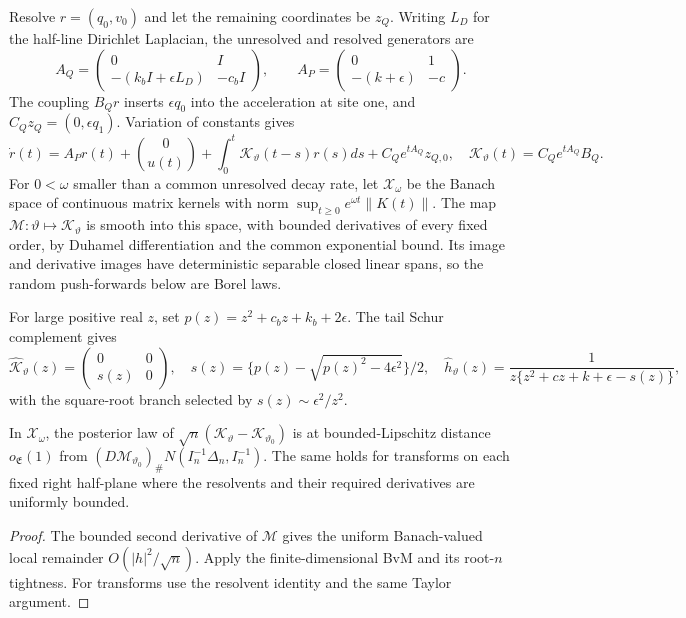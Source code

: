 Resolve \(r=(q_0,v_0)\) and let the remaining coordinates be \(z_Q\).
Writing \(L_D\) for the half-line Dirichlet Laplacian, the unresolved
and resolved generators are
\[
 A_Q=\begin{pmatrix}0&I\\-(k_bI+\epsilon L_D)&-c_bI\end{pmatrix},
 \qquad A_P=\begin{pmatrix}0&1\\-(k+\epsilon)&-c\end{pmatrix}.
\]
The coupling \(B_Qr\) inserts \(\epsilon q_0\) into the acceleration
at site one, and \(C_Qz_Q=(0,\epsilon q_1)\). Variation of constants gives
\begin{equation}
 \dot r(t)=A_Pr(t)+\binom0{u(t)}+
 \int_0^t\mathcal K_\vartheta(t-s)r(s)ds+C_Qe^{tA_Q}z_{Q,0},
 \quad \mathcal K_\vartheta(t)=C_Qe^{tA_Q}B_Q.
 \label{eq:gle}
\end{equation}
For \(0<\omega\) smaller than a common unresolved decay rate, let
\(\mathcal X_\omega\) be the Banach space of continuous matrix kernels
with norm \(\sup_{t\ge0}e^{\omega t}\|K(t)\|\).
The map \(\mathscr M:\vartheta\mapsto\mathcal K_\vartheta\) is smooth
into this space, with bounded derivatives of every fixed order, by
Duhamel differentiation and the common exponential bound.
Its image and derivative images have deterministic separable closed
linear spans, so the random push-forwards below are Borel laws.

For large positive real \(z\), set \(p(z)=z^2+c_bz+k_b+2\epsilon\).
The tail Schur complement gives
\[
 \widehat{\mathcal K}_\vartheta(z)=\begin{pmatrix}0&0\\s(z)&0\end{pmatrix},
 \quad s(z)=\{p(z)-\sqrt{p(z)^2-4\epsilon^2}\}/2,
 \quad \widehat h_\vartheta(z)=
 \frac1{z\{z^2+cz+k+\epsilon-s(z)\}},
\]
with the square-root branch selected by \(s(z)\sim\epsilon^2/z^2\).

\begin{corollary}
\label{cor:memory-posterior}
In \(\mathcal X_\omega\), the posterior law of
\(\sqrt n(\mathcal K_\vartheta-\mathcal K_{\vartheta_0})\) is at
bounded-Lipschitz distance \(o_{\mathfrak E}(1)\) from
\((D\mathscr M_{\vartheta_0})_\#N(I_n^{-1}\Delta_n,I_n^{-1})\).
The same holds for transforms on each fixed right half-plane where the
resolvents and their required derivatives are uniformly bounded.
\end{corollary}
\begin{proof}
The bounded second derivative of \(\mathscr M\) gives the uniform
Banach-valued local remainder \(O(|h|^2/\sqrt n)\).
Apply the finite-dimensional BvM and its root-\(n\) tightness.
For transforms use the resolvent identity and the same Taylor argument.
\end{proof}

